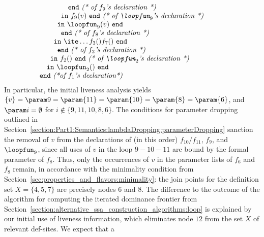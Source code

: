 \begin{equation}
\begin{array}{l}
\begin{array}{l}
\begin{array}[t]{l}
\begin{array}[t]{l}
\begin{array}[t]{l}
\begin{array}[t]{l}
\begin{array}[t]{l}
                                       \quad \mathtt{end}\ \textit{(* of $f_9$'s\ declaration *)}\\
                             \mathtt{in}\ f_9(v)\ \mathtt{end}\ \textit{(* of\ $\loopfun_9$'s\ declaration *)}
                          \end{array}\\
                                 \mathtt{in}\ \loopfun_9(v)\ \mathtt{end} 
                               \end{array}\\
                         \quad \mathtt{end}\ \textit{(* of $f_8$'s declaration *)}\\
                         \mathtt{in}\ \ite \ldots {f_3()} {f_7()}\ \mathtt{end}
                       \end{array} \\
               \quad \mathtt{end}\ \textit{(* of $f_2$'s declaration *)}\\      
               \mathtt{in}\ f_2()\ \mathtt{end}\ \textit{(* of\ $\loopfun_2$'s\ declaration *)}
             \end{array}\\
       \mathtt{in}\ \loopfun_2()\ \mathtt{end}
     \end{array}
  \end{array}\\ 
\mathtt{end}\ \textit{(*of\ $f_1$'s\ declaration*)}
\end{array} 
\end{equation}
In particular, the initial liveness analysis yields $\{v\} = \param 9
= \param {11} = \param {10} = \param {8} = \param {6}$, and $\param i
= \emptyset$ for $i \notin \{9,11,10,8,6\}$.  The conditions for
parameter dropping outlined in
Section~\ref{section:Part1:Semantics:lambdaDropping:parameterDropping}
sanction the removal of $v$ from the declarations of (in this order)
$f_{10}/f_{11}$, $f_9$, and $\loopfun_9$, since all uses of $v$ in the
loop $9-10-11$ are bound by the formal parameter of $f_8$.  Thus, only
the occurrences of $v$ in the parameter lists of $f_6$ and $f_8$
remain, in accordance with the minimality condition from
Section~\ref{sec:properties_and_flavors:minimality}: the join points
for the definition set $X=\{4, 5, 7\}$ are precisely nodes $6$ and
$8$. The difference to the outcome of the algorithm for computing the
iterated dominance frontier from
Section~\ref{section:alternative_ssa_construction_algorithms:loop} is
explained by our initial use of liveness information, which eliminates
node $12$ from the set $X$ of relevant def-sites. We expect that a
